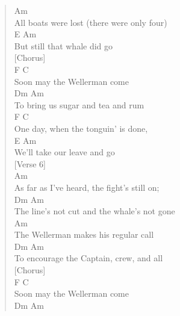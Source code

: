 \documentclass[11pt]{article}
\begin{document}
\begin{verse}
\hspace*{5em}Am\\
All boats were lost (there were only four)\\
\hspace*{6em}E                  Am\\
But still that whale did go\\
\vspace*{1em}
[Chorus]\\
\vspace*{1em}
\hspace*{1em}F            C\\
Soon may the Wellerman come\\
\hspace*{4em}Dm                 Am\\
To bring us sugar and tea and rum\\
F                 C\\
One day, when the tonguin’ is done,\\
\hspace*{7em}E                 Am\\
We’ll take our leave and go\\
\vspace*{1em}
[Verse 6]\\
\vspace*{1em}
\hspace*{3em}Am\\
As far as I've heard, the fight's still on;\\
\hspace*{5em}Dm                     Am\\
The line's not cut and the whale's not gone\\
\hspace*{5em}Am\\
The Wellerman makes his regular call\\
\hspace*{5em}Dm                    Am\\
To encourage the Captain, crew, and all\\
\vspace*{1em}
[Chorus]\\
\vspace*{1em}
\hspace*{1em}F            C\\
Soon may the Wellerman come\\
\hspace*{4em}Dm                 Am\\

\end{verse}
\end{document}
